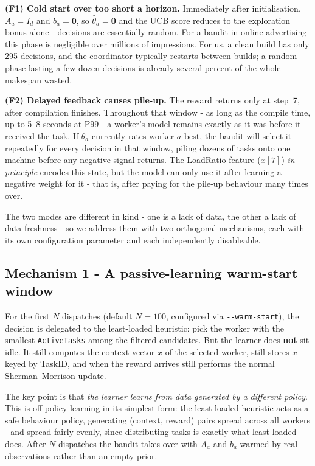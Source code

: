 \documentclass[final,5p,times,twocolumn]{elsarticle}
\begin{document}
\textbf{(F1) Cold start over too short a horizon.} Immediately after initialisation, $A_a=I_d$ and $b_a=\mathbf{0}$, so $\hat\theta_a=\mathbf{0}$ and the UCB score reduces to the exploration bonus alone - decisions are essentially random. For a bandit in online advertising this phase is negligible over millions of impressions. For us, a clean build has only 295 decisions, and the coordinator typically restarts between builds; a random phase lasting a few dozen decisions is already several percent of the whole makespan wasted.

\textbf{(F2) Delayed feedback causes pile-up.} The reward returns only at step~7, after compilation finishes. Throughout that window - as long as the compile time, up to 5--8 seconds at P99 - a worker's model remains exactly as it was before it received the task. If $\hat\theta_a$ currently rates worker $a$ best, the bandit will select it repeatedly for every decision in that window, piling dozens of tasks onto one machine before any negative signal returns. The LoadRatio feature ($x[7]$) \emph{in principle} encodes this state, but the model can only use it after learning a negative weight for it - that is, after paying for the pile-up behaviour many times over.

The two modes are different in kind - one is a lack of data, the other a lack of data freshness - so we address them with two orthogonal mechanisms, each with its own configuration parameter and each independently disableable.

\subsection{Mechanism 1 - A passive-learning warm-start window}
\label{sec:mech1}

For the first $N$ dispatches (default $N=100$, configured via \texttt{-{}-warm-start}), the decision is delegated to the least-loaded heuristic: pick the worker with the smallest \texttt{ActiveTasks} among the filtered candidates. But the learner does \textbf{not} sit idle. It still computes the context vector $x$ of the selected worker, still stores $x$ keyed by TaskID, and when the reward arrives still performs the normal Sherman--Morrison update.

The key point is that \emph{the learner learns from data generated by a different policy}. This is off-policy learning in its simplest form: the least-loaded heuristic acts as a safe behaviour policy, generating (context, reward) pairs spread across all workers - and spread fairly evenly, since distributing tasks is exactly what least-loaded does. After $N$ dispatches the bandit takes over with $A_a$ and $b_a$ warmed by real observations rather than an empty prior.
\end{document}
